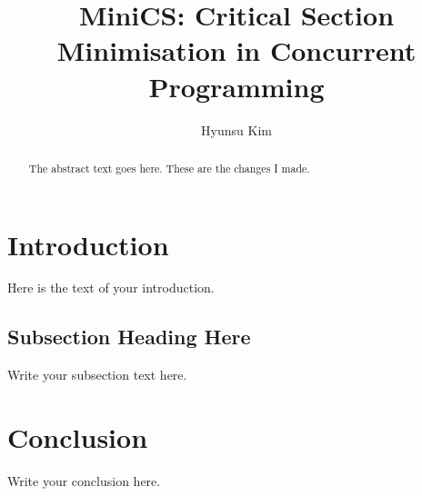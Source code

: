 \documentclass[sigchi]{acmart}
\begin{document}
\title{MiniCS: Critical Section Minimisation in Concurrent Programming}
\author{Hyunsu Kim}


\begin{abstract}
The abstract text goes here. These are the changes I made.
\end{abstract}

\maketitle

\section{Introduction}
Here is the text of your introduction.

\subsection{Subsection Heading Here}
Write your subsection text here.

\section{Conclusion}
Write your conclusion here.
\end{document}
